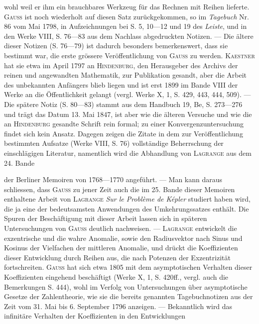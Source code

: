 wohl weil er ihm ein brauchbares Werkzeug für das Rechnen mit
Reihen lieferte. \textsc{Gauss} ist noch wiederholt auf diesen Satz zurückgekommen,
so im \textit{Tagebuch} Nr. 86 vom Mai 1798, in Aufzeichnungen bei S. 5, 10—12
und 19 des \textit{Leiste}, und in den Werke VIII, S. 76—83 aus dem Nachlass
abgedruckten Notizen. — Die ältere dieser Notizen (S. 76—79) ist dadurch
besonders bemerkenswert, dass sie bestimmt war, die erste grössere Veröffentlichung
von \textsc{Gauss} zu werden. \textsc{Kaestner} hat sie etwa im April 1797 an
\textsc{Hindenburg}, den Herausgeber des Archivs der reinen und angewandten Mathematik,
zur Publikation gesandt, aber die Arbeit des unbekannten Anfängers
blieb liegen und ist erst 1899 im Bande VIII der Werke an die Öffentlichkeit
gelangt (vergl. Werke X, 1, S. 429, 443, 444, 509). — Die spätere Notiz
(S. 80—83) stammt aus dem Handbuch 19, Be, S. 273—276 und trägt das Datum
13. Mai 1847, ist aber wie die älteren Versuche und wie die an \textsc{Hindenburg}
gesandte Schrift rein formal; zu einer Konvergenzuntersuchung findet sich kein
Ansatz. Dagegen zeigen die Zitate in dem zur Veröffentlichung bestimmten
Aufsatze (Werke VIII, S. 76) vollständige Beherrschung der einschlägigen
Literatur, namentlich wird die Abhandlung von \textsc{Lagrange} aus dem 24. Bande\par
{}
\clearpage{}
\noindent der Berliner Memoiren von 1768—1770 angeführt. — Man kann daraus
schliessen, dass \textsc{Gauss} zu jener Zeit auch die im 25. Bande dieser Memoiren
enthaltene Arbeit von \textsc{Lagrange} \textit{Sur le Problème de Képler} studiert haben
wird, die ja eine der bedeutsamsten Anwendungen des Umkehrungssatzes enthält.
Die Spuren der Beschäftigung mit dieser Arbeit lassen sich in späteren
Untersuchungen von \textsc{Gauss} deutlich nachweisen. — \textsc{Lagrange} entwickelt die
exzentrische und die wahre Anomalie, sowie den Radiusvektor nach Sinus
und Kosinus der Vielfachen der mittleren Anomalie, und drückt die Koeffizienten
dieser Entwicklung durch Reihen aus, die nach Potenzen der Exzentrizität
fortschreiten. \textsc{Gauss} hat sich etwa 1805 mit dem asymptotischen Verhalten
dieser Koeffizienten eingehend beschäftigt (Werke X, 1, S. 420ff., vergl.
auch die Bemerkungen S. 444), wohl im Verfolg von Untersuchungen über
asymptotische Gesetze der Zahlentheorie, wie sie die bereits genannten Tagebuchnotizen
aus der Zeit vom 31. Mai bis 6. September 1796 anzeigen. —
Bekanntlich wird das infinitäre Verhalten der Koeffizienten in den Entwicklungen
